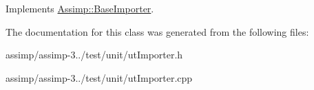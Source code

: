 Implements \hyperlink{class_assimp_1_1_base_importer_a070b8c3f63767ad535c8ac509b725fc4}{Assimp\+::\+Base\+Importer}.



The documentation for this class was generated from the following files\+:\begin{DoxyCompactItemize}
\item 
assimp/assimp-\/3../test/unit/ut\+Importer.\+h\item 
assimp/assimp-\/3../test/unit/ut\+Importer.\+cpp\end{DoxyCompactItemize}
